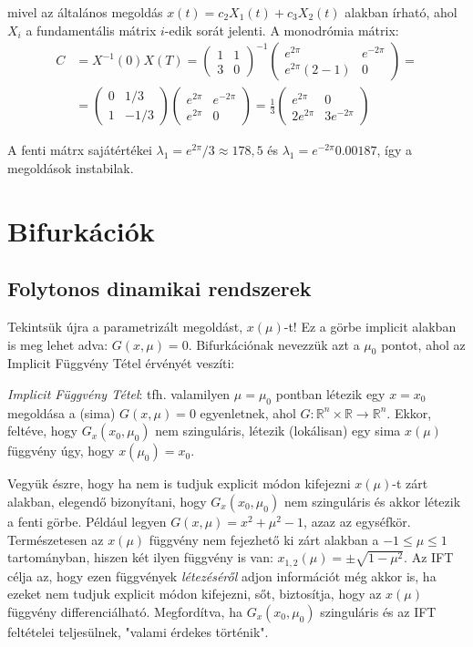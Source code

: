 mivel az általános megoldás $x(t)=c_2 X_1(t)+c_3 X_2(t)$ alakban írható, ahol $X_i$ a fundamentális mátrix $i$-edik sorát jelenti. A monodrómia mátrix:
%
\begin{eqnarray}
C&=X^{-1}(0) X(T)=
\begin{pmatrix}1&1\\ 3&0\end{pmatrix}^{-1}
\begin{pmatrix}
e^{2 \pi} &  e^{-2\pi}\\
e^{2\pi}\left( 2-1\right) &0
\end{pmatrix}
=\\
&=
\begin{pmatrix}0&1/3\\ 1&-1/3\end{pmatrix}
\begin{pmatrix}
e^{2 \pi} &  e^{-2\pi}\\
e^{2\pi} &0
\end{pmatrix}
=\frac{1}{3}
\begin{pmatrix}
e^{2 \pi} &0 \\
2 e^{2 \pi}& 3 e^{-2 \pi}
\end{pmatrix}
\end{eqnarray}

A fenti mátrx sajátértékei $\lambda_1=e^{2 \pi}/3\approx178,5$ és $\lambda_1=e^{-2 \pi}0.00187$, így a megoldások instabilak.

\section{Bifurkációk}

\subsection{Folytonos dinamikai rendszerek}

Tekintsük újra a parametrizált megoldást, $x(\mu)$-t! Ez a görbe implicit alakban is meg lehet adva: $G(x,\mu)=0$. Bifurkációnak nevezzük azt a $\mu_0$ pontot, ahol az Implicit Függvény Tétel érvényét veszíti:

\emph{Implicit Függvény Tétel}: tfh. valamilyen $\mu=\mu_0$ pontban létezik egy $x=x_0$ megoldása a (sima) $G(x,\mu)=0$ egyenletnek, ahol $G: \mathbb{R}^n\times\mathbb{R}\rightarrow\mathbb{R}^n$. Ekkor, feltéve, hogy $G_x(x_0,\mu_0)$ nem szinguláris, létezik (lokálisan) egy sima $x(\mu)$ függvény úgy, hogy $x(\mu_0)=x_0$.

Vegyük észre, hogy ha nem is tudjuk explicit módon kifejezni $x(\mu)$-t zárt alakban, elegendő bizonyítani, hogy $G_x(x_0,\mu_0)$ nem szinguláris és akkor létezik a fenti görbe. Például legyen $G(x,\mu)=x^2+\mu^2-1$, azaz az egyséfkör. Természetesen az $x(\mu)$ függvény nem fejezhető ki zárt alakban a $-1\leq \mu \leq 1$ tartományban, hiszen két ilyen függvény is van: $x_{1,2}(\mu)=\pm\sqrt{1-\mu^2}$. Az IFT célja az, hogy ezen függvények \emph{létezéséről} adjon információt még akkor is, ha ezeket nem tudjuk explicit módon kifejezni, sőt, biztosítja, hogy az $x(\mu)$ függvény differenciálható. Megfordítva, ha $G_x(x_0,\mu_0)$ szinguláris és az IFT feltételei teljesülnek, "valami érdekes történik".

